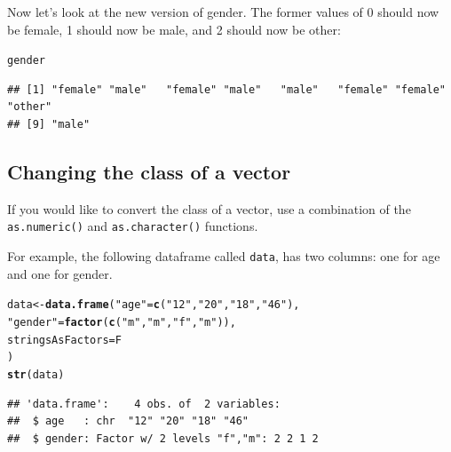 \documentclass{tufte-book}\usepackage[]{graphicx}\usepackage[]{color}
\makeatletter
\newcommand{\hlstr}[1]{\textcolor[rgb]{0.192,0.494,0.8}{#1}}%
\newcommand{\hlstd}[1]{\textcolor[rgb]{0.345,0.345,0.345}{#1}}%
\newcommand{\hlkwb}[1]{\textcolor[rgb]{0.69,0.353,0.396}{#1}}%
\newcommand{\hlkwc}[1]{\textcolor[rgb]{0.333,0.667,0.333}{#1}}%
\newcommand{\hlkwd}[1]{\textcolor[rgb]{0.737,0.353,0.396}{\textbf{#1}}}%
\newenvironment{kframe}{%
 \def\at@end@of@kframe{}%
 \ifinner\ifhmode%
  \def\at@end@of@kframe{\end{minipage}}%
  \begin{minipage}{\columnwidth}%
 \fi\fi%
 \def\FrameCommand##1{\hskip\@totalleftmargin \hskip-\fboxsep
 \colorbox{shadecolor}{##1}\hskip-\fboxsep
     \hskip-\linewidth \hskip-\@totalleftmargin \hskip\columnwidth}%
 \MakeFramed {\advance\hsize-\width
   \@totalleftmargin\z@ \linewidth\hsize
   \@setminipage}}%
 {\par\unskip\endMakeFramed%
 \at@end@of@kframe}
\newenvironment{knitrout}{}{} %
\makeatother
\begin{document}
Now let's look at the new version of gender. The former values of 0 should now be female, 1 should now be male, and 2 should now be other:

\begin{footnotesize}
\begin{knitrout}
\color{fgcolor}\begin{kframe}
\begin{alltt}
\hlstd{gender}
\end{alltt}
\begin{verbatim}
## [1] "female" "male"   "female" "male"   "male"   "female" "female" "other" 
## [9] "male"
\end{verbatim}
\end{kframe}
\end{knitrout}
\end{footnotesize}

\subsection{Changing the class of a vector}

If you would like to convert the class of a vector, use a combination of the \texttt{as.numeric()} and \texttt{as.character()} functions.

For example, the following dataframe called \texttt{data}, has two columns: one for age and one for gender.
\begin{knitrout}
\color{fgcolor}\begin{kframe}
\begin{alltt}
\hlstd{data} \hlkwb{<-} \hlkwd{data.frame}\hlstd{(}\hlstr{"age"} \hlstd{=} \hlkwd{c}\hlstd{(}\hlstr{"12"}\hlstd{,} \hlstr{"20"}\hlstd{,} \hlstr{"18"}\hlstd{,} \hlstr{"46"}\hlstd{),}
                   \hlstr{"gender"} \hlstd{=} \hlkwd{factor}\hlstd{(}\hlkwd{c}\hlstd{(}\hlstr{"m"}\hlstd{,} \hlstr{"m"}\hlstd{,} \hlstr{"f"}\hlstd{,} \hlstr{"m"}\hlstd{)),}
                   \hlkwc{stringsAsFactors} \hlstd{= F}
                   \hlstd{)}
\hlkwd{str}\hlstd{(data)}
\end{alltt}
\begin{verbatim}
## 'data.frame':	4 obs. of  2 variables:
##  $ age   : chr  "12" "20" "18" "46"
##  $ gender: Factor w/ 2 levels "f","m": 2 2 1 2
\end{verbatim}
\end{kframe}
\end{knitrout}
\end{document}
